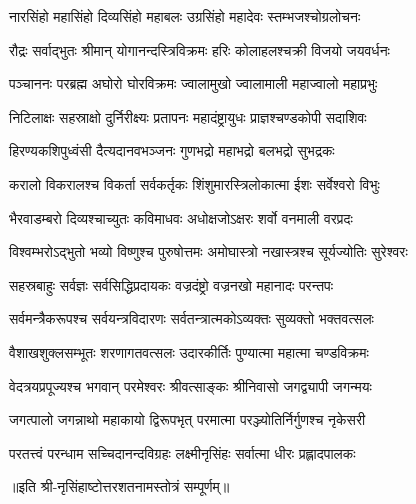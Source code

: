 

\twolineshloka
{नारसिंहो महासिंहो दिव्यसिंहो महाबलः}
{उग्रसिंहो महादेवः स्तम्भजश्चोग्रलोचनः}

\twolineshloka
{रौद्रः सर्वाद्भुतः श्रीमान् योगानन्दस्त्रिविक्रमः}
{हरिः कोलाहलश्चक्री विजयो जयवर्धनः}

\twolineshloka
{पञ्चाननः परब्रह्म अघोरो घोरविक्रमः}
{ज्वालामुखो ज्वालामाली महाज्वालो महाप्रभुः}

\twolineshloka
{निटिलाक्षः सहस्राक्षो दुर्निरीक्ष्यः प्रतापनः}
{महादंष्ट्रायुधः  प्राज्ञश्चण्डकोपी सदाशिवः}

\twolineshloka
{हिरण्यकशिपुध्वंसी दैत्यदानवभञ्जनः}
{गुणभद्रो महाभद्रो बलभद्रो सुभद्रकः}

\twolineshloka
{करालो विकरालश्च विकर्ता सर्वकर्तृकः}
{शिंशुमारस्त्रिलोकात्मा ईशः सर्वेश्वरो विभुः}

\twolineshloka
{भैरवाडम्बरो दिव्यश्चाच्युतः कविमाधवः}
{अधोक्षजोऽक्षरः शर्वो वनमाली वरप्रदः}

\twolineshloka
{विश्वम्भरोऽद्भुतो भव्यो विष्णुश्च पुरुषोत्तमः}
{अमोघास्त्रो नखास्त्रश्च सूर्यज्योतिः सुरेश्वरः}

\twolineshloka
{सहस्रबाहुः सर्वज्ञः सर्वसिद्धिप्रदायकः}
{वज्रदंष्ट्रो वज्रनखो महानादः परन्तपः}

\twolineshloka
{सर्वमन्त्रैकरूपश्च सर्वयन्त्रविदारणः}
{सर्वतन्त्रात्मकोऽव्यक्तः सुव्यक्तो भक्तवत्सलः}

\twolineshloka
{वैशाखशुक्लसम्भूतः शरणागतवत्सलः}
{उदारकीर्तिः पुण्यात्मा महात्मा चण्डविक्रमः}

\twolineshloka
{वेदत्रयप्रपूज्यश्च भगवान् परमेश्वरः}
{श्रीवत्साङ्कः श्रीनिवासो जगद्व्यापी  जगन्मयः}

\twolineshloka
{जगत्पालो जगन्नाथो महाकायो द्विरूपभृत्}
{परमात्मा परञ्ज्योतिर्निर्गुणश्च नृकेसरी}

\twolineshloka
{परतत्त्वं परन्धाम सच्चिदानन्दविग्रहः}
{लक्ष्मीनृसिंहः सर्वात्मा धीरः प्रह्लादपालकः}

॥इति श्री-नृसिंहाष्टोत्तरशतनामस्तोत्रं सम्पूर्णम्॥
